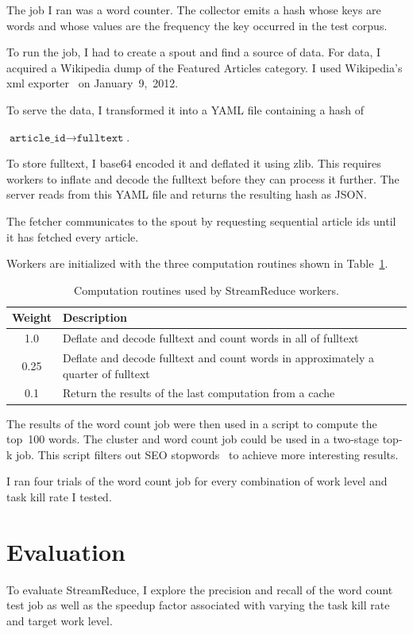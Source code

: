 \documentclass[12pt,twocolumn]{article}
\begin{document}
The job I ran was a word counter. The collector emits a hash whose keys are words and whose
values are the frequency the key occurred in the test corpus.

To run the job, I had to create a spout and find a source of data. For data, I acquired a
Wikipedia dump of the Featured Articles category. I used Wikipedia's xml
exporter~\cite{wikipedia:special:export} on January~9,~2012.

To serve the data, I transformed it into a YAML file containing a hash of
\begin{center}
$\texttt{article\_id}\rightarrow\texttt{fulltext}$.
\end{center}
To store fulltext, I base64 encoded it and
deflated it using zlib. This requires workers to inflate and decode the fulltext before they
can process it further. The server reads from this YAML file and returns the resulting hash as
JSON.

The fetcher communicates to the spout by requesting sequential article ids until it has fetched
every article.

Workers are initialized with the three computation routines shown in Table~\ref{table:workerTasks}.

\begin{table}
\begin{tabularx}{\linewidth}{|c|X|}
 \hline
Weight & Description \\ \hline
1.0 & Deflate and decode fulltext and count words in all of fulltext \\ \hline
0.25 & Deflate and decode fulltext and count words in approximately a quarter of fulltext \\ \hline
0.1 & Return the results of the last computation from a cache \\ \hline
\end{tabularx}
\caption{Computation routines used by StreamReduce workers.}
\label{table:workerTasks}
\end{table}

The results of the word count job were then used in a script to compute the top~100 words.
The cluster and word count job could be used in a two-stage top-k job. This script filters
out SEO stopwords~\cite{stopwords} to achieve more interesting results.

I ran four trials of the word count job for every combination of work level and task kill
rate I tested.

\section{Evaluation}
\label{sec:evaluation}
To evaluate StreamReduce, I explore the precision and recall of the word count test job as well as the
speedup factor associated with varying the task kill rate and target work level.
\end{document}
